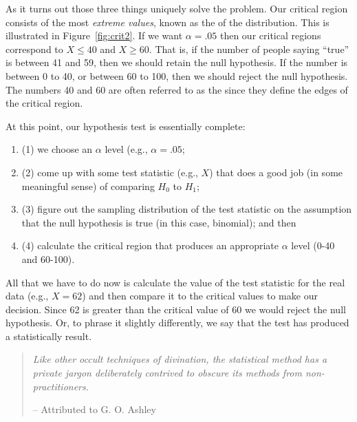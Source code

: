 As it turns out those three things uniquely solve the problem. Our critical region consists of the most {\it extreme values}, known as the  of the distribution. This is illustrated in Figure~\ref{fig:crit2}. If we want $\alpha = .05$ then our critical regions correspond to $X \leq 40$ and $X \geq 60$. That is, if the number of people saying ``true'' is between 41 and 59, then we should retain the null hypothesis. If the number is between 0 to 40, or between 60 to 100, then we should reject the null hypothesis. The numbers 40 and 60 are often referred to as the  since they define the edges of the critical region.

\pagebreak
\noindent
At this point, our hypothesis test is essentially complete:
\begin{enumerate} \itemsep -2pt
\item (1) we choose an $\alpha$ level (e.g., $\alpha = .05$; 
\item (2) come up with some test statistic (e.g., $X$) that does a good job (in some meaningful sense) of comparing $H_0$ to $H_1$; 
\item (3) figure out the sampling distribution of the test statistic on the assumption that the null hypothesis is true (in this case, binomial); and then 
\item (4) calculate the critical region that produces an appropriate $\alpha$ level (0-40 and 60-100). 
\end{enumerate}
All that we have to do now is calculate the value of the test statistic for the real data (e.g., $X = 62$) and then compare it to the critical values to make our decision. Since 62 is greater than the critical value of 60 we would reject the null hypothesis. Or, to phrase it slightly differently, we say that the test has produced a statistically  result. 



\begin{quote}
{\it Like other occult techniques of divination, the statistical method has a private jargon deliberately contrived to obscure its methods from non-practitioners.} 

\hspace*{2cm} -- Attributed to G. O. Ashley
\end{quote}

